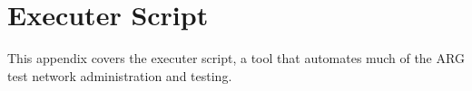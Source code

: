 \chapter{Executer Script}
\label{chp:executer}

\par This appendix covers the executer script, a tool that automates much of the \ac{ARG} test network administration and testing.


